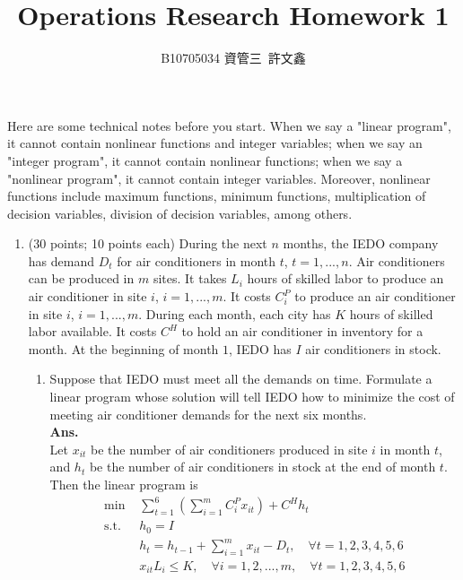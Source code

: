 \documentclass[14pt]{article}
\title{Operations Research Homework 1}
\author{B10705034 資管三\ 許文鑫}
\begin{document}
\maketitle
Here are some technical notes before you start. When we say a "linear program", it cannot contain nonlinear functions and integer variables; when we say an "integer program", it cannot contain nonlinear functions; when we say a "nonlinear program", it cannot contain integer variables. Moreover, nonlinear functions include maximum functions, minimum functions, multiplication of decision variables, division of decision variables, among others.
\begin{enumerate}
      \item (30 points; 10 points each) During the next $n$ months, the IEDO company has demand $D_t$ for air conditioners in month $t$, $t = 1, ..., n$. Air conditioners can be produced in $m$ sites. It takes $L_i$ hours of skilled labor to produce an air conditioner in site $i$, $i = 1, ..., m$. It costs $C^P_i$ to produce an air conditioner in site $i$, $i = 1, ..., m$. During each month, each city has $K$ hours of skilled labor available. It costs $C^H$ to hold an air conditioner in inventory for a month. At the beginning of month $1$, IEDO has $I$ air conditioners in stock.
            \begin{enumerate}
                  \item Suppose that IEDO must meet all the demands on time. Formulate a linear program whose solution will tell IEDO how to minimize the cost of meeting air conditioner demands for the next six months.\\
                        \textbf{Ans. }\\
                        Let $x_{it}$ be the number of air conditioners produced in site $i$ in month $t$, and $h_t$ be the number of air conditioners in stock at the end of month $t$. Then the linear program is
                        \begin{align*}
                              \text{min }  & \sum_{t=1}^6(\sum_{i=1}^m C^P_ix_{it}) + C^Hh_t                                      \\
                              \text{s.t. } & h_0 = I                                                                              \\
                                           & h_t = h_{t-1} + \sum_{i=1}^m x_{it} - D_t, \quad \forall t = 1, 2, 3, 4, 5, 6        \\
                                           & x_{it}L_i \leq K, \quad \forall i = 1, 2, ..., m, \quad \forall t = 1, 2, 3, 4, 5, 6 \\

\end{align*}
\end{enumerate}
\end{enumerate}
\end{document}
